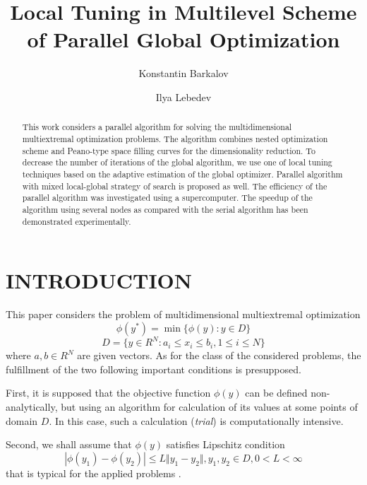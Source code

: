 \documentclass{aip-cp}
\begin{document}
\title{Local Tuning in Multilevel Scheme of Parallel Global Optimization}

\author[aff1]{Konstantin Barkalov}
\author[aff1]{Ilya Lebedev}


\maketitle

\begin{abstract}
This work considers a parallel algorithm for solving the multidimensional multiextremal optimization problems. The algorithm combines nested optimization scheme and Peano-type space filling curves for the dimensionality reduction. To decrease the number of iterations of the global algorithm, we use one of local tuning techniques based on the adaptive estimation of the global optimizer. Parallel algorithm with mixed local-global strategy of search is proposed as well. The efficiency of the parallel algorithm was investigated using a supercomputer. The speedup of the algorithm using several nodes as compared with the serial algorithm has been demonstrated experimentally.
\end{abstract}

\section{INTRODUCTION}

This paper considers the problem of multidimensional multiextremal optimization
\begin{displaymath}
\phi(y^*)=\min\{\phi(y):y\in D\}
\end{displaymath}
\begin{displaymath}
D=\{y\in R^N:a_i\leqslant x_i\leqslant{b_i}, 1\leqslant{i}\leqslant{N}\}
\end{displaymath}
where $a,b \in R^N$ are given vectors. As for the class of the considered problems, the fulfillment of the two following important conditions is presupposed.

First, it is supposed that the objective function $\phi(y)$ can be defined non-analytically, but using an algorithm for calculation of its values at some points of domain $D$. In this case, such a calculation (\textit{trial}) is computationally intensive.

Second, we shall assume that $\phi(y)$ satisfies Lipschitz condition
\begin{displaymath}
|\phi(y_1)-\phi(y_2)|\leqslant L\Vert y_1-y_2\Vert,y_1,y_2\in D,0<L<\infty
\end{displaymath}
that is typical for the applied problems \citep{automaticaAppl,svmAppl,recogAppl,determApproaches}.
\end{document}
